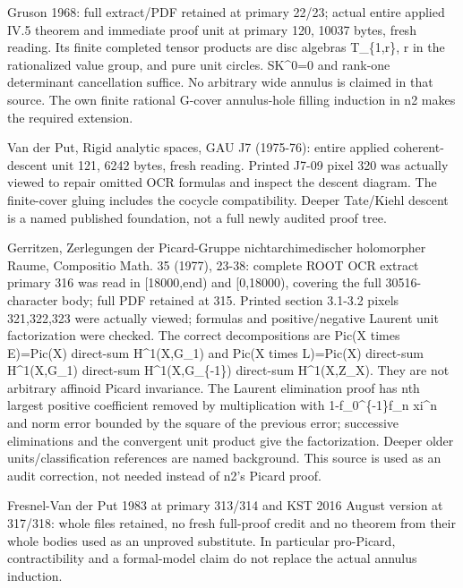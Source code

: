 \documentclass[11pt]{article}
\begin{document}
Gruson 1968: full extract/PDF retained at primary 22/23; actual entire applied IV.5 theorem and immediate proof unit at primary 120, 10037 bytes, fresh reading. Its finite completed tensor products are disc algebras T\_\{1,r\}, r in the rationalized value group, and pure unit circles. SK\textasciicircum{}0=0 and rank-one determinant cancellation suffice. No arbitrary wide annulus is claimed in that source. The own finite rational G-cover annulus-hole filling induction in n2 makes the required extension.

Van der Put, Rigid analytic spaces, GAU J7 (1975-76): entire applied coherent-descent unit 121, 6242 bytes, fresh reading. Printed J7-09 pixel 320 was actually viewed to repair omitted OCR formulas and inspect the descent diagram. The finite-cover gluing includes the cocycle compatibility. Deeper Tate/Kiehl descent is a named published foundation, not a full newly audited proof tree.

Gerritzen, Zerlegungen der Picard-Gruppe nichtarchimedischer holomorpher Raume, Compositio Math. 35 (1977), 23-38: complete ROOT OCR extract primary 316 was read in [18000,end) and [0,18000), covering the full 30516-character body; full PDF retained at 315. Printed section 3.1-3.2 pixels 321,322,323 were actually viewed; formulas and positive/negative Laurent unit factorization were checked. The correct decompositions are Pic(X times E)=Pic(X) direct-sum H\textasciicircum{}1(X,G\_1) and Pic(X times L)=Pic(X) direct-sum H\textasciicircum{}1(X,G\_1) direct-sum H\textasciicircum{}1(X,G\_\{-1\}) direct-sum H\textasciicircum{}1(X,Z\_X). They are not arbitrary affinoid Picard invariance. The Laurent elimination proof has nth largest positive coefficient removed by multiplication with 1-f\_0\textasciicircum{}\{-1\}f\_n xi\textasciicircum{}n and norm error bounded by the square of the previous error; successive eliminations and the convergent unit product give the factorization. Deeper older units/classification references are named background. This source is used as an audit correction, not needed instead of n2's Picard proof.

Fresnel-Van der Put 1983 at primary 313/314 and KST 2016 August version at 317/318: whole files retained, no fresh full-proof credit and no theorem from their whole bodies used as an unproved substitute. In particular pro-Picard, contractibility and a formal-model claim do not replace the actual annulus induction.
\end{document}
